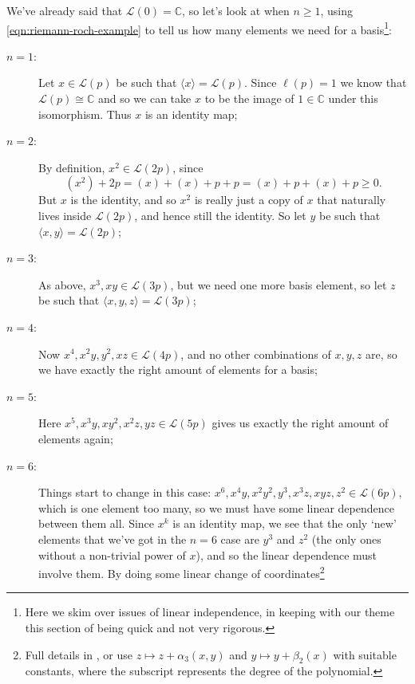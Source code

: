 \documentclass[10pt,notitlepage]{article}
\numberwithin{equation}{subsection}
\newcommand{\cc}{\mathbb{C}}
\begin{document}
\begin{example}
            We've already said that $\mathcal{L}(0)=\cc$, so let's look at when $n\geqslant1$, using \cref{eqn:riemann-roch-example} to tell us how many elements we need for a basis\footnote{%
                Here we skim over issues of linear independence, in keeping with our theme this section of being quick and not very rigorous.
            }:
            \begin{description}
                \item[$n=1$:] Let $x\in\mathcal{L}(p)$ be such that $\langle x\rangle=\mathcal{L}(p)$.
                    Since $\ell(p)=1$ we know that $\mathcal{L}(p)\cong\cc$ and so we can take $x$ to be the image of $1\in\cc$ under this isomorphism.
                    Thus $x$ is an identity map;
                \item[$n=2$:] By definition, $x^2\in\mathcal{L}(2p)$, since
                    \[
                        (x^2)+2p = (x)+(x)+p+p = (x)+p+(x)+p \geqslant0.
                    \]
                    But $x$ is the identity, and so $x^2$ is really just a copy of $x$ that naturally lives inside $\mathcal{L}(2p)$, and hence still the identity.
                    So let $y$ be such that $\langle x,y\rangle=\mathcal{L}(2p)$;
                \item[$n=3$:] As above, $x^3,xy\in\mathcal{L}(3p)$, but we need one more basis element, so let $z$ be such that $\langle x,y,z\rangle=\mathcal{L}(3p)$;
                \item[$n=4$:] Now $x^4,x^2y,y^2,xz\in\mathcal{L}(4p)$, and no other combinations of $x,y,z$ are, so we have exactly the right amount of elements for a basis;
                \item[$n=5$:] Here $x^5,x^3y,xy^2,x^2z,yz\in\mathcal{L}(5p)$ gives us exactly the right amount of elements again;
                \item[$n=6$:] Things start to change in this case: $x^6,x^4y,x^2y^2,y^3,x^3z,xyz,z^2\in\mathcal{L}(6p)$, which is one element too many, so we must have some linear dependence between them all.
                    Since $x^k$ is an identity map, we see that the only `new' elements that we've got in the $n=6$ case are $y^3$ and $z^2$ (the only ones without a non-trivial power of $x$), and so the linear dependence must involve them.
                    By doing some linear change of coordinates\footnote{%
                        Full details in \cite[Chapter~IV,~Proposition~4.6]{Hartshorne:1977we}, or use $z\mapsto z+\alpha_3(x,y)$ and $y\mapsto y+\beta_2(x)$ with suitable constants, where the subscript represents the degree of the polynomial.
}
\end{description}
\end{example}
\end{document}
